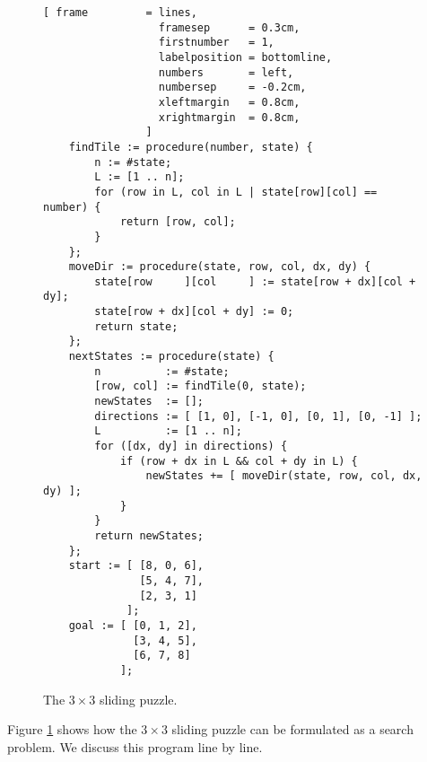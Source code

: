 \begin{figure}[!ht]
\centering
\begin{Verbatim}[ frame         = lines, 
                  framesep      = 0.3cm, 
                  firstnumber   = 1,
                  labelposition = bottomline,
                  numbers       = left,
                  numbersep     = -0.2cm,
                  xleftmargin   = 0.8cm,
                  xrightmargin  = 0.8cm,
                ]
    findTile := procedure(number, state) {
        n := #state;
        L := [1 .. n]; 
        for (row in L, col in L | state[row][col] == number) {
            return [row, col];
        }
    };
    moveDir := procedure(state, row, col, dx, dy) {
        state[row     ][col     ] := state[row + dx][col + dy];
        state[row + dx][col + dy] := 0;
        return state;
    };
    nextStates := procedure(state) {
        n          := #state;
        [row, col] := findTile(0, state);
        newStates  := [];
        directions := [ [1, 0], [-1, 0], [0, 1], [0, -1] ];
        L          := [1 .. n];
        for ([dx, dy] in directions) {
            if (row + dx in L && col + dy in L) {
                newStates += [ moveDir(state, row, col, dx, dy) ];
            }
        }
        return newStates;
    };
    start := [ [8, 0, 6],
               [5, 4, 7],
               [2, 3, 1]
             ];
    goal := [ [0, 1, 2], 
              [3, 4, 5], 
              [6, 7, 8]
            ];
\end{Verbatim}
\vspace*{-0.3cm}
\caption{The $3 \times 3$ sliding puzzle.}
\label{fig:sliding-puzzle.stlx}
\end{figure}
Figure \ref{fig:sliding-puzzle.stlx} shows how the $3 \times 3$ sliding puzzle can be formulated as
a search problem.  We discuss this program line by line.
